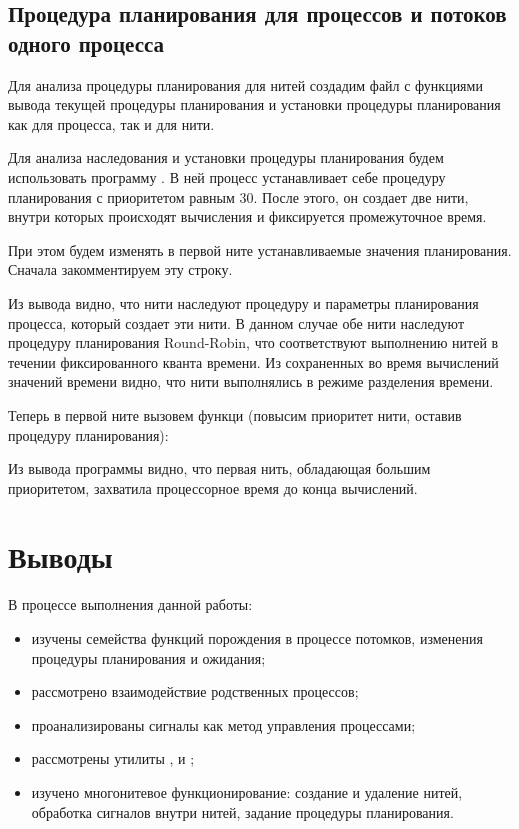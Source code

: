\subsection{Процедура планирования для процессов и потоков одного процесса}

Для анализа процедуры планирования для нитей создадим файл  с функциями вывода текущей процедуры планирования и установки процедуры планирования как для процесса, так и для нити.



Для анализа наследования и установки процедуры планирования будем использовать программу . В ней процесс устанавливает себе процедуру планирования  с приоритетом равным 30. После этого, он создает две нити, внутри которых происходят вычисления и фиксируется промежуточное время.

\newpage



При этом будем изменять в первой ните устанавливаемые значения планирования. Сначала закомментируем эту строку.

\newpage



Из вывода видно, что нити наследуют процедуру и параметры планирования процесса, который создает эти нити. В данном случае обе нити наследуют процедуру планирования Round-Robin, что соответствуют выполнению нитей в течении фиксированного кванта времени. Из сохраненных во время вычислений значений времени видно, что нити выполнялись в режиме разделения времени.

Теперь в первой ните вызовем функци (повысим приоритет нити, оставив процедуру планирования):



Из вывода программы видно, что первая нить, обладающая большим приоритетом, захватила процессорное время до конца вычислений.

\newpage

\section{Выводы}

В процессе выполнения данной работы:
\begin{itemize}
	\item изучены семейства функций порождения в процессе потомков, изменения процедуры планирования и ожидания;
	\item рассмотрено взаимодействие родственных процессов;
	\item проанализированы сигналы как метод управления процессами;
	\item рассмотрены утилиты ,  и ;
	\item изучено многонитевое функционирование: создание и удаление нитей, обработка сигналов внутри нитей, задание процедуры планирования.
\end{itemize}

